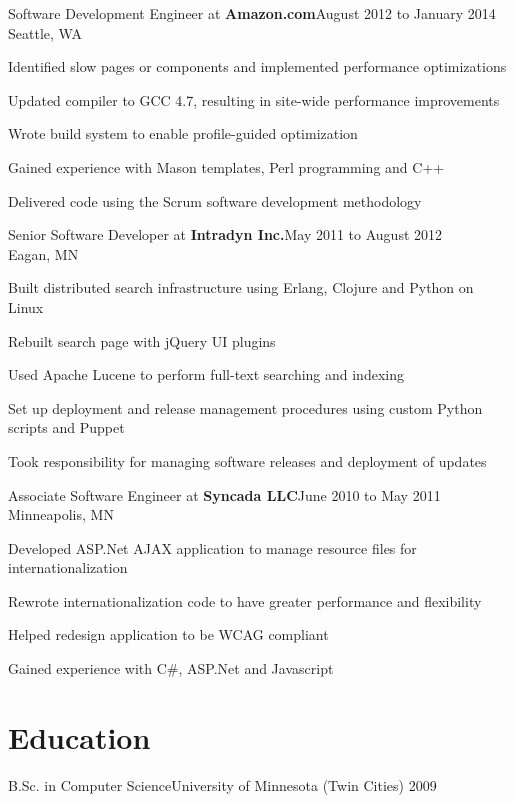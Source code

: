 \documentclass[letterpaper]{article}
\newenvironment{resume-list}
{\begin{itemize}
 \setlength{\itemsep}{0pt}
 \setlength{\parskip}{0pt}}
{\end{itemize}}
\begin{document}
\noindent Software Development Engineer at {\bfseries Amazon.com}\dotfill August 2012 to January 2014\\
Seattle, WA
\begin{resume-list}
\item Identified slow pages or components and implemented performance optimizations
\item Updated compiler to GCC 4.7, resulting in site-wide performance improvements
\item Wrote build system to enable profile-guided optimization
\item Gained experience with Mason templates, Perl programming and C++
\item Delivered code using the Scrum software development methodology
\end{resume-list}
\noindent Senior Software Developer at {\bfseries Intradyn Inc.}\dotfill May 2011 to August 2012\\
Eagan, MN
\begin{resume-list}
\item Built distributed search infrastructure using Erlang, Clojure and Python on Linux
\item Rebuilt search page with jQuery UI plugins
\item Used Apache Lucene to perform full-text searching and indexing
\item Set up deployment and release management procedures using custom Python scripts and Puppet
\item Took responsibility for managing software releases and deployment of updates
\end{resume-list}
\noindent Associate Software Engineer at {\bfseries Syncada LLC}\dotfill June 2010 to May 2011\\
Minneapolis, MN
\begin{resume-list}
\item Developed ASP.Net AJAX application to manage resource files for internationalization
\item Rewrote internationalization code to have greater performance and flexibility
\item Helped redesign application to be WCAG compliant
\item Gained experience with C\#, ASP.Net and Javascript
\end{resume-list}
\section*{Education}
\noindent B.Sc. in Computer Science\dotfill University of Minnesota (Twin Cities) 2009\\
\end{document}
